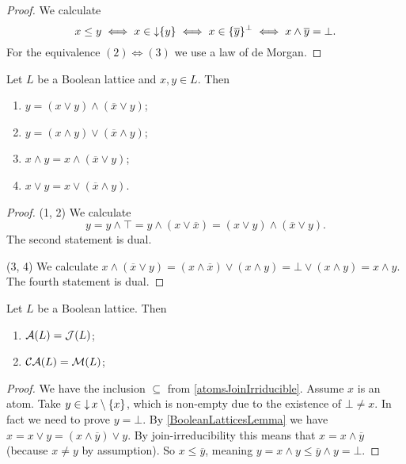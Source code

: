 \begin{proof}
We calculate
\[ x \leq y \iff x\in\operatorname{\downarrow}\{y\} \iff x\in\{\overline{y}\}^\perp \iff x\wedge \overline{y} = \bot. \]
For the equivalence $(2) \Leftrightarrow (3)$ we use a law of de Morgan.
\end{proof}

\begin{lemma} \label{BooleanLatticesLemma}
Let $L$ be a Boolean lattice and $x,y\in L$. Then
\begin{enumerate}
\item $y = (x\vee y) \wedge (\overline{x}\vee y)$;
\item $y = (x\wedge y) \vee (\overline{x}\wedge y)$;
\item $x \wedge y = x\wedge (\overline{x}\vee y)$;
\item $x \vee y = x\vee (\overline{x}\wedge y)$.
\end{enumerate}
\end{lemma}
\begin{proof}
(1, 2) We calculate
\[ y = y \wedge \top = y \wedge (x\vee \overline{x}) = (x\vee y) \wedge (\overline{x}\vee y). \]
The second statement is dual.

(3, 4) We calculate $x\wedge (\overline{x}\vee y) = (x\wedge \overline{x})\vee (x\wedge y) = \bot \vee (x\wedge y) = x\wedge y$. The fourth statement is dual.
\end{proof}

\begin{lemma} \label{atomsJoinIrriducibleBoolean}
Let $L$ be a Boolean lattice. Then
\begin{enumerate}
\item $\operatorname{\mathcal{A}}(L) = \operatorname{\mathcal{J}}(L)$;
\item $\operatorname{\mathcal{CA}}(L) = \operatorname{\mathcal{M}}(L)$;
\end{enumerate}
\end{lemma}
\begin{proof}
We have the inclusion $\subseteq$ from \ref{atomsJoinIrriducible}. Assume $x$ is an atom. Take $y\in \operatorname{\downarrow} x\setminus\{x\}$, which is non-empty due to the existence of $\bot \neq x$. In fact we need to prove $y = \bot$. By \ref{BooleanLatticesLemma} we have $x = x\vee y = (x\wedge \overline{y})\vee y$. By join-irreducibility this means that $x = x\wedge \overline{y}$ (because $x\neq y$ by assumption). So $x\leq \overline{y}$, meaning $y = x\wedge y \leq \overline{y}\wedge y = \bot$.
\end{proof}


